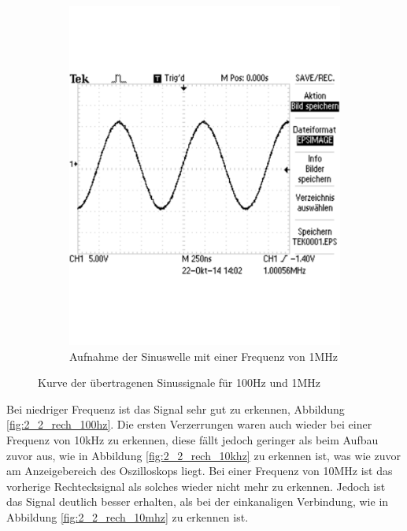 \documentclass[12pt,a4paper]{article}
\begin{document}
\begin{figure}[H]
\begin{subfigure}[b]{0.48\textwidth}
                \includegraphics[width=\textwidth , scale = 0.4]{2_2_sin_1mhz.pdf}
                \caption[Aufnahme der Sinuswelle mit einer Frequenz von 1MHz]{Aufnahme der Sinuswelle mit einer Frequenz von 1MHz}
  				\label{fig:2_2_sin_1mhz}
        \end{subfigure}
        \caption{Kurve der übertragenen Sinussignale für 100Hz und 1MHz}
        \label{fig:2_2_sin_vergleich}
\end{figure}

Bei niedriger Frequenz ist das Signal sehr gut zu erkennen, Abbildung \ref{fig:2_2_rech_100hz}.
Die ersten Verzerrungen waren auch wieder bei einer Frequenz von 10kHz zu erkennen, diese fällt jedoch geringer als beim Aufbau zuvor aus, wie in Abbildung \ref{fig:2_2_rech_10khz} zu erkennen ist, was wie zuvor am Anzeigebereich des Oszilloskops liegt.
Bei einer Frequenz von 10MHz ist das vorherige Rechtecksignal als solches wieder nicht mehr zu erkennen. Jedoch ist das Signal deutlich besser erhalten, als bei der einkanaligen Verbindung, wie in Abbildung \ref{fig:2_2_rech_10mhz} zu erkennen ist.
\end{document}
